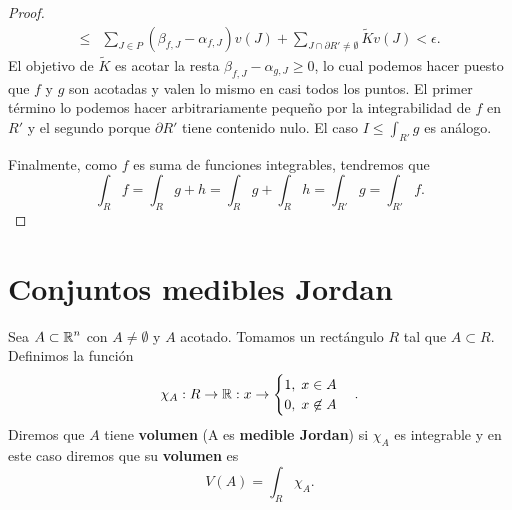 \begin{proof}
\[\begin{split}
	\leq & \sum_{J \in P}\left(\beta_{f,J}-\alpha_{f,J}\right)v\left(J\right) + \sum_{J \cap \partial R' \neq \emptyset}\tilde{K}v\left(J\right) < \epsilon.
\end{split}
\]
El objetivo de $\displaystyle \tilde{K} $ es acotar la resta $\displaystyle \beta_{f,J}-\alpha_{g,J} \geq 0 $, lo cual podemos hacer puesto que $\displaystyle f $ y $\displaystyle g $ son acotadas y valen lo mismo en casi todos los puntos. El primer término lo podemos hacer arbitrariamente pequeño por la integrabilidad de $\displaystyle f $ en $\displaystyle R' $ y el segundo porque $\displaystyle \partial R' $ tiene contenido nulo. El caso $\displaystyle I \leq \int _{R'}g  $ es análogo.

Finalmente, como $\displaystyle f $ es suma de funciones integrables, tendremos que 
\[\int _{R}f =\int _{R}g + h = \int _{R}g +\int _{R}h  = \int _{R'}g = \int _{R'}f  .\]
\end{proof}

\section{Conjuntos medibles Jordan}
\begin{definition}
Sea $\displaystyle A \subset \mathbb{R}^{n} $ con $\displaystyle A\neq \emptyset $ y $\displaystyle A $ acotado. Tomamos un rectángulo $\displaystyle R $ tal que $\displaystyle A \subset R $. Definimos la función 
\[\chi_{A} : R \to \mathbb{R} : x \to 
\begin{cases}
1, \; x \in A \\
0, \; x \not\in A
\end{cases}
.\]
Diremos que $\displaystyle A $ tiene \textbf{volumen} (A es \textbf{medible Jordan}) si $\displaystyle \chi_{A} $ es integrable y en este caso diremos que su \textbf{volumen} es 
\[V\left(A\right) = \int _{R}\chi_{A} .\]
\end{definition}

